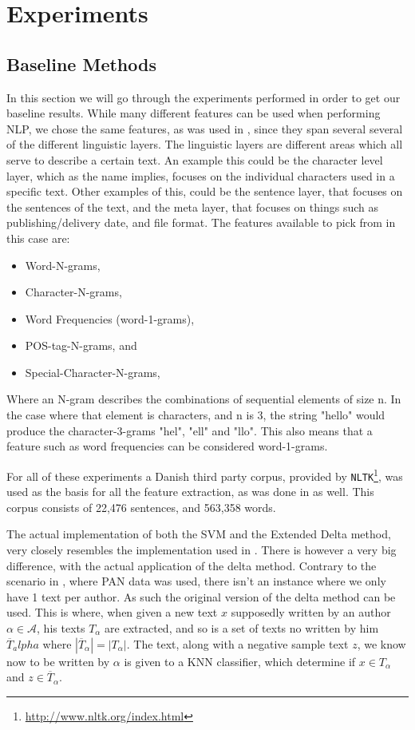 \section{Experiments} \label{sec:experiments}


\subsection{Baseline Methods}

In this section we will go through the experiments performed in order to get
our baseline results. While many different features can be used when performing
\gls{NLP}, we chose the same features, as was used in \cite{US}, since they
span several several of the different linguistic layers. The linguistic layers
are different areas which all serve to describe a certain text. An example this
could be the character level layer, which as the name implies, focuses on the
individual characters used in a specific text. Other examples of this, could
be the sentence layer, that focuses on the sentences of the text, and the meta
layer, that focuses on things such as publishing/delivery date, and file format.
The features available to pick from in this case are:

\begin{itemize}
    \item Word-N-grams,
    \item Character-N-grams,
    \item Word Frequencies (word-1-grams),
    \item \gls{POS}-tag-N-grams, and
    \item Special-Character-N-grams,
\end{itemize}

Where an N-gram describes the combinations of sequential elements of size n. In
the case where that element is characters, and n is 3, the string "hello" would
produce the character-3-grams "hel", "ell" and "llo". This also means that a
feature such as word frequencies can be considered word-1-grams.

For all of these experiments a Danish third party corpus, provided by
\texttt{NLTK}\footnote{\url{http://www.nltk.org/index.html}}, was used as the
basis for all the feature extraction, as was done in \cite{US} as well. This
corpus consists of 22,476 sentences, and 563,358 words.

The actual implementation of both the \gls{SVM} and the Extended Delta method,
very closely resembles the implementation used in \cite{US}. There is however
a very big difference, with the actual application of the delta method.
Contrary to the scenario in \cite{US}, where PAN data was used, there isn't an
instance where we only have 1 text per author. As such the original version
of the delta method can be used. This is where, when given a new text $x$
supposedly written by an author $\alpha \in \mathcal{A}$, his texts $T_\alpha$
are extracted, and so is a set of texts no written by him $\overline{T}_alpha$
where $|\overline{T}_\alpha| = |T_\alpha|$. The text, along with a negative
sample text $z$, we know now to be written by $\alpha$ is given to a \gls{KNN}
classifier, which determine if $x \in T_\alpha$ and $z \in \overline{T}_\alpha$.

